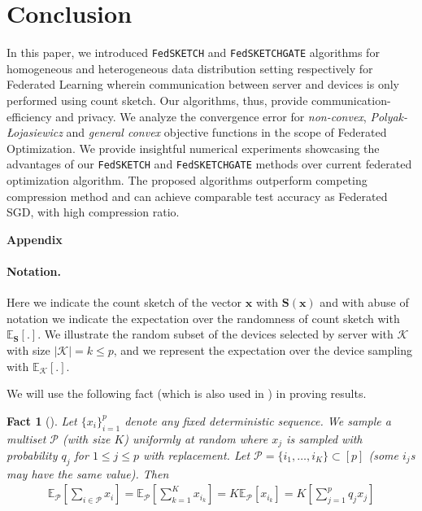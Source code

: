 \documentclass[twoside]{article}
\newcommand{\pl}{Polyak-\L{}ojasiewicz}
\newtheorem{fact}[theorem]{Fact}
\begin{document}
\vspace{-0.05in}
\section{Conclusion}
\vspace{-0.05in}

In this paper, we introduced \texttt{FedSKETCH} and \texttt{FedSKETCHGATE} algorithms for homogeneous and heterogeneous data distribution setting respectively for Federated Learning wherein communication between server and devices is only performed using count sketch. 
Our algorithms, thus, provide communication-efficiency and privacy. 
We analyze the convergence error for \emph{non-convex}, \emph{\pl} and \emph{general convex} objective functions in the scope of Federated Optimization.  
We provide insightful numerical experiments showcasing the advantages of our \texttt{FedSKETCH} and \texttt{FedSKETCHGATE} methods over current federated optimization algorithm. The proposed algorithms outperform competing compression method and can achieve comparable test accuracy as Federated SGD, with high compression ratio.




\newpage
\appendix
%

\onecolumn

\noindent\textbf{\LARGE Appendix}\\

\paragraph{Notation.} Here we indicate the count sketch of the vector $\boldsymbol{x}$ with $\mathbf{S}(\boldsymbol{x})$ and with abuse of notation we indicate the expectation over the randomness of count sketch with $\mathbb{E}_{\mathbf{S}}[.]$. We illustrate the random subset of the devices selected by server with $\mathcal{K}$ with size $|\mathcal{K}|=k\leq p$, and we represent the expectation over the device sampling with $\mathbb{E}_{\mathcal{K}}[.]$. 

We will use the following fact (which is also used in \cite{li2019convergence,haddadpour2019convergence}) in proving results.
\begin{fact}[\cite{li2019convergence,haddadpour2019convergence}]\label{fact:1}
Let
$\{x_i\}_{i=1}^p$ denote any fixed deterministic sequence. We sample a multiset $\mathcal{P}$ (with size $K$) uniformly at random where $x_j$ is sampled  with probability $q_j$ for $1\leq j\leq p$ with replacement.  Let $\mathcal{P} = \{i_1,\ldots, i_K\} \subset[p]$ (some $i_j$s may have the same value). Then
\begin{align}
    \mathbb{E}_{\mathcal{P}}\left[\sum_{i\in \mathcal{P}}x_i\right]=\mathbb{E}_{\mathcal{P}}\left[\sum_{k=1}^Kx_{i_k}\right]=K\mathbb{E}_{\mathcal{P}}\left[x_{i_k}\right]=K\left[\sum_{j=1}^pq_jx_j\right]
\end{align}
\end{fact}
\end{document}
